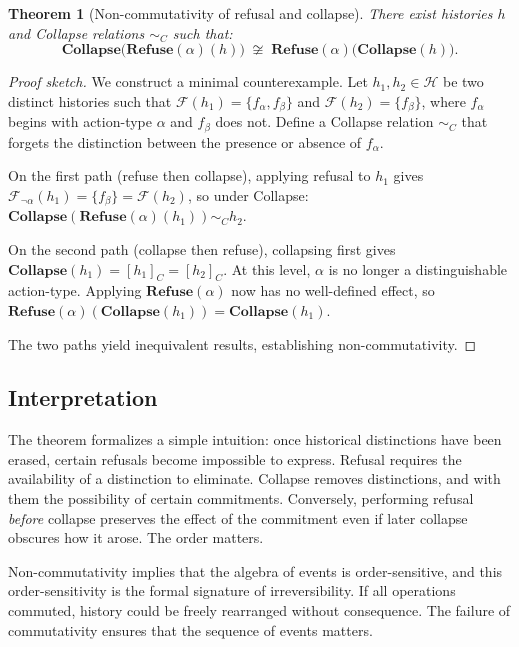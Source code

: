 \documentclass[11pt]{article}
\newtheorem{theorem}{Theorem}
\begin{document}
\begin{theorem}[Non-commutativity of refusal and collapse]
\label{thm:noncomm}
There exist histories $h$ and Collapse relations $\sim_C$ such that:
\[
\mathbf{Collapse}\bigl(\mathbf{Refuse}(\alpha)(h)\bigr)
\;\not\cong\;
\mathbf{Refuse}(\alpha)\bigl(\mathbf{Collapse}(h)\bigr).
\]
\end{theorem}

\begin{proof}[Proof sketch]
We construct a minimal counterexample. Let $h_1, h_2 \in \mathcal{H}$ be two
distinct histories such that $\mathcal{F}(h_1) = \{ f_\alpha, f_\beta \}$ and
$\mathcal{F}(h_2) = \{ f_\beta \}$, where $f_\alpha$ begins with action-type
$\alpha$ and $f_\beta$ does not. Define a Collapse relation $\sim_C$ that forgets
the distinction between the presence or absence of $f_\alpha$.

On the first path (refuse then collapse), applying refusal to $h_1$ gives
$\mathcal{F}_{\neg \alpha}(h_1) = \{ f_\beta \} = \mathcal{F}(h_2)$, so under
Collapse: $\mathbf{Collapse}(\mathbf{Refuse}(\alpha)(h_1)) \sim_C h_2$.

On the second path (collapse then refuse), collapsing first gives
$\mathbf{Collapse}(h_1) = [h_1]_C = [h_2]_C$. At this level, $\alpha$ is no
longer a distinguishable action-type. Applying $\mathbf{Refuse}(\alpha)$ now
has no well-defined effect, so
$\mathbf{Refuse}(\alpha)(\mathbf{Collapse}(h_1)) = \mathbf{Collapse}(h_1)$.

The two paths yield inequivalent results, establishing non-commutativity.
\end{proof}

\subsection{Interpretation}

The theorem formalizes a simple intuition: once historical distinctions have
been erased, certain refusals become impossible to express. Refusal requires
the availability of a distinction to eliminate. Collapse removes distinctions,
and with them the possibility of certain commitments. Conversely, performing
refusal \emph{before} collapse preserves the effect of the commitment even if
later collapse obscures how it arose. The order matters.

Non-commutativity implies that the algebra of events is order-sensitive, and
this order-sensitivity is the formal signature of irreversibility. If all
operations commuted, history could be freely rearranged without consequence.
The failure of commutativity ensures that the sequence of events matters.
\end{document}

